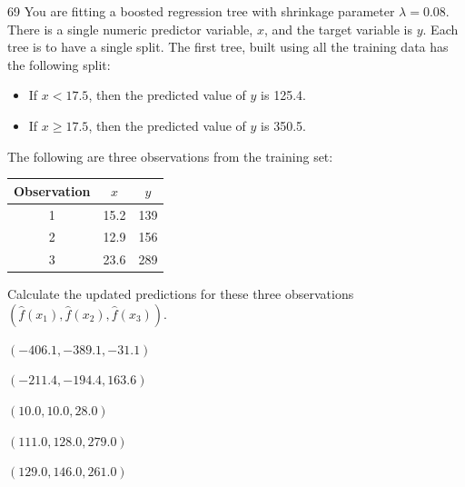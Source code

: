 \begin{question}{69}
You are fitting a boosted regression tree with shrinkage parameter $\lambda = 0.08$. There is a single numeric predictor variable, $x$, and the target variable is $y$. Each tree is to have a single split. The first tree, built using all the training data has the following split:
\begin{itemize}
\item If $x < 17.5$, then the predicted value of $y$ is 125.4.
\item If $x \geqslant 17.5$, then the predicted value of $y$ is 350.5.
\end{itemize}
The following are three observations from the training set:
\begin{center}
\begin{tabular}{|c|c|c|}
\hline
Observation & $x$ & $y$ \\ \hline
1 & 15.2 & 139 \\ \hline
2 & 12.9 & 156 \\ \hline
3 & 23.6 & 289 \\ \hline
\end{tabular}
\end{center}

Calculate the updated predictions for these three observations $(\hat{f}(x_1), \hat{f}(x_2), \hat{f}(x_3))$.

\begin{choices}
\item $(-406.1, -389.1, -31.1)$
\item $(-211.4, -194.4, 163.6)$
\item $(10.0, 10.0, 28.0)$
\item $(111.0, 128.0, 279.0)$
\item $(129.0, 146.0, 261.0)$
\end{choices}
\end{question}

